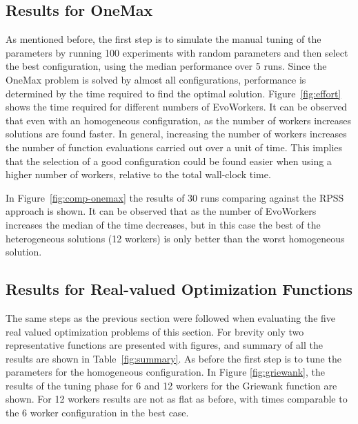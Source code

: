 \documentclass{llncs}
\begin{document}
\subsection{Results for OneMax}
As mentioned before, the first step is to simulate the manual tuning of the parameters 
by running 100 experiments with random parameters and then select the best configuration, 
using the median performance over 5 runs. Since the OneMax problem is solved by almost all
configurations, performance is determined by the time required to find the optimal solution.
Figure~\ref{fig:effort} shows the time required for different numbers of EvoWorkers. 
It can be observed that even with an homogeneous configuration, as the number of workers 
increases solutions are found faster. In general, increasing the number of workers increases 
the number of function evaluations carried out over a unit of time. This implies that the selection
of a good configuration could be found easier when using a higher number of workers, relative
to the total wall-clock time.  

In Figure~\ref{fig:comp-onemax} the results of 30 runs comparing against the RPSS approach is shown.
It can be observed that as the number of EvoWorkers increases the median of the time decreases, but
in this case the best of the heterogeneous solutions (12 workers) is only better than the worst homogeneous
solution. %

\subsection{Results for Real-valued Optimization Functions}
The same steps as the previous section were followed when evaluating the five real valued 
optimization problems of this section.  For brevity only two representative functions are 
presented with figures, and summary of all the results are shown in Table~\ref{fig:summary}. As before
the first step is to tune the parameters for the homogeneous configuration.
In Figure \ref{fig:griewank}, the results of the tuning phase for 6 and 12 workers 
for the Griewank function are shown. For 12 workers results are not as flat as before, 
with times comparable to the 6 worker configuration in the best case.
\end{document}
